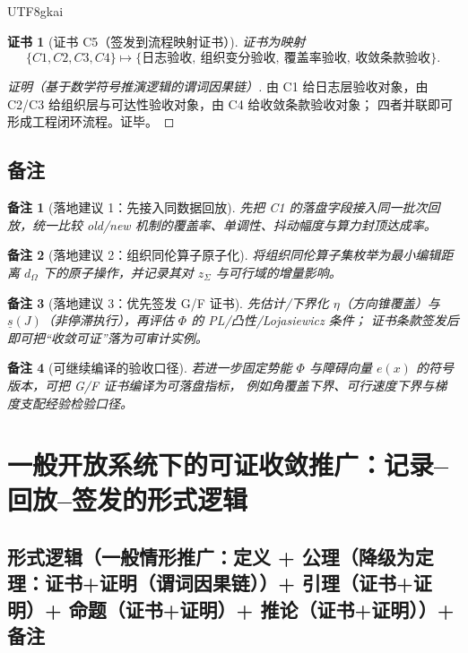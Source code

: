 \documentclass[12pt]{article}
\newtheorem{remark}{备注}[section]
\newtheorem{Certificate}{证书}[section]
\begin{document}
\begin{CJK*}{UTF8}{gkai}
\begin{Certificate}[证书 C5（签发到流程映射证书）]
\label{cert:tex28-ch13-c5}
证书为映射
\[
  \{C1,C2,C3,C4\}
  \mapsto
  \{\text{日志验收},\ \text{组织变分验收},\ \text{覆盖率验收},\ \text{收敛条款验收}\}.
\]
\end{Certificate}

\begin{proof}[证明（基于数学符号推演逻辑的谓词因果链）]
由 C1 给日志层验收对象，由 C2/C3 给组织层与可达性验收对象，由 C4 给收敛条款验收对象；
四者并联即可形成工程闭环流程。证毕。
\end{proof}

\subsection{备注}
\label{subsec:tex28-ch13-remarks}

\begin{remark}[落地建议 1：先接入同数据回放]
先把 C1 的落盘字段接入同一批次回放，统一比较 old/new 机制的覆盖率、单调性、抖动幅度与算力封顶达成率。
\end{remark}

\begin{remark}[落地建议 2：组织同伦算子原子化]
将组织同伦算子集枚举为最小编辑距离 $d_{\Omega}$ 下的原子操作，并记录其对 $z_{\Sigma}$ 与可行域的增量影响。
\end{remark}

\begin{remark}[落地建议 3：优先签发 G/F 证书]
先估计/下界化 $\eta$（方向锥覆盖）与 $\underline s(J)$（非停滞执行），再评估 $\Phi$ 的 PL/凸性/Lojasiewicz 条件；
证书条款签发后即可把“收敛可证”落为可审计实例。
\end{remark}

\begin{remark}[可继续编译的验收口径]
若进一步固定势能 $\Phi$ 与障碍向量 $e(x)$ 的符号版本，可把 G/F 证书编译为可落盘指标，
例如角覆盖下界、可行速度下界与梯度支配经验检验口径。
\end{remark}

\clearpage

\section{一般开放系统下的可证收敛推广：记录--回放--签发的形式逻辑}
\label{sec:tex28-ch14}

\subsection{形式逻辑（一般情形推广：定义 + 公理（降级为定理：证书+证明（谓词因果链））+ 引理（证书+证明）+ 命题（证书+证明）+ 推论（证书+证明））+ 备注}
\label{subsec:tex28-ch14-logic-structure}


\end{CJK*}
\end{document}
